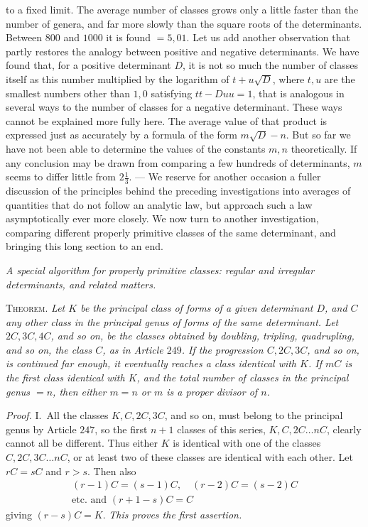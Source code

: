 to a fixed limit. The average number of classes grows only a little faster than the number of genera, and far more slowly than the square roots of the determinants. Between \(800\) and \(1000\) it is found \(=5,01\). Let us add another observation that partly restores the analogy between positive and negative determinants. We have found that, for a positive determinant \(D\), it is not so much the number of classes itself as this number multiplied by the logarithm of \(t+u\surd D\), where \(t,u\) are the smallest numbers other than \(1,0\) satisfying \(tt-Duu=1\), that is analogous in several ways to the number of classes for a negative determinant. These ways cannot be explained more fully here. The average value of that product is expressed just as accurately by a formula of the form \(m\surd D-n\). But so far we have not been able to determine the values of the constants \(m,n\) theoretically. If any conclusion may be drawn from comparing a few hundreds of determinants, \(m\) seems to differ little from \(2\frac13\). — We reserve for another occasion a fuller discussion of the principles behind the preceding investigations into averages of quantities that do not follow an analytic law, but approach such a law asymptotically ever more closely. We now turn to another investigation, comparing different properly primitive classes of the same determinant, and bringing this long section to an end.

\begin{center}\textit{A special algorithm for properly primitive classes: regular and irregular determinants, and related matters.}\end{center}

\textsc{Theorem.} \textit{Let \(K\) be the principal class of forms of a given determinant \(D\), and \(C\) any other class in the principal genus of forms of the same determinant. Let \(2C,3C, 4C\), and so on, be the classes obtained by doubling, tripling, quadrupling, and so on, the class \(C\), as in Article \(249\). If the progression \(C,2C,3C\), and so on, is continued far enough, it eventually reaches a class identical with \(K\). If \(mC\) is the first class identical with \(K\), and the total number of classes in the principal genus \(=n\), then either \(m=n\) or \(m\) is a proper divisor of \(n\).}

\textit{Proof.} I.\ All the classes \(K,C,2C,3C\), and so on, must belong to the principal genus by Article \(247\), so the first \(n+1\) classes of this series, \(K,C,2C\ldots nC\), clearly cannot all be different. Thus either \(K\) is identical with one of the classes \(C,2C,3C\ldots nC\), or at least two of these classes are identical with each other.
Let \(rC=sC\) and \(r>s\). Then also
\[\begin{gathered}(r-1)C=(s-1)C,\quad(r-2)C=(s-2)C\\\text{etc. and }(r+1-s)C=C\end{gathered}\]
giving \((r-s)C=K\). \textit{This proves the first assertion.}

